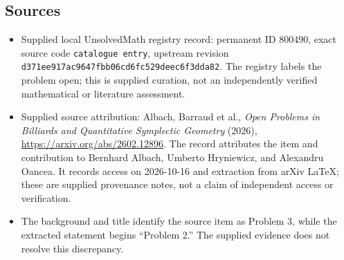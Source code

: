 \documentclass[11pt]{article}
\begin{document}
\subsection{Sources}
\begin{itemize}
\item Supplied local UnsolvedMath registry record: permanent ID \(800490\), exact source code \texttt{catalogue entry}, upstream revision \texttt{d371ee917ac9647fbb06cd6fc529deec6f3dda82}. The registry labels the problem open; this is supplied curation, not an independently verified mathematical or literature assessment.
\item Supplied source attribution: Albach, Barraud et al., \emph{Open Problems in Billiards and Quantitative Symplectic Geometry} (2026), \url{https://arxiv.org/abs/2602.12896}. The record attributes the item and contribution to Bernhard Albach, Umberto Hryniewicz, and Alexandru Oancea. It records access on 2026-10-16 and extraction from arXiv LaTeX; these are supplied provenance notes, not a claim of independent access or verification.
\item The background and title identify the source item as Problem 3, while the extracted statement begins ``Problem 2.'' The supplied evidence does not resolve this discrepancy.
\end{itemize}
\end{document}
